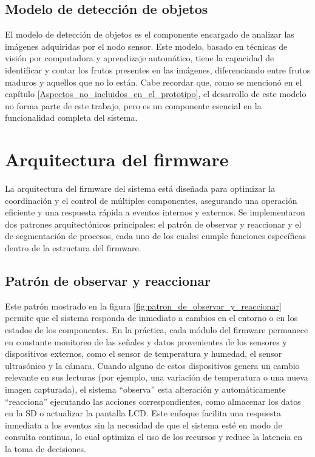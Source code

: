 \subsection{Modelo de detección de objetos}

El modelo de detección de objetos es el componente encargado de analizar las imágenes adquiridas por el nodo sensor. Este modelo, basado en técnicas de visión por computadora y aprendizaje automático, tiene la capacidad de identificar y contar los frutos presentes en las imágenes, diferenciando entre frutos maduros y aquellos que no lo están. Cabe recordar que, como se mencionó en el capítulo \ref{Aspectos_no_incluidos_en_el_prototipo}, el desarrollo de este modelo no forma parte de este trabajo, pero es un componente esencial en la funcionalidad completa del sistema. 

\newpage

\section{Arquitectura del firmware}

La arquitectura del firmware del sistema está diseñada para optimizar la coordinación y el control de múltiples componentes, asegurando una operación eficiente y una respuesta rápida a eventos internos y externos. Se implementaron dos patrones arquitectónicos principales: el patrón de observar y reaccionar y el de segmentación de procesos, cada uno de los cuales cumple funciones específicas dentro de la estructura del firmware.

\subsection{Patrón de observar y reaccionar}

Este patrón mostrado en la figura \ref{fig:patron_de_observar_y_reaccionar} permite que el sistema responda de inmediato a cambios en el entorno o en los estados de los componentes. En la práctica, cada módulo del firmware permanece en constante monitoreo de las señales y datos provenientes de los sensores y dispositivos externos, como el sensor de temperatura y humedad, el sensor ultrasónico y la cámara. Cuando alguno de estos dispositivos genera un cambio relevante en sus lecturas (por ejemplo, una variación de temperatura o una nueva imagen capturada), el sistema ``observa'' esta alteración y automáticamente ``reacciona'' ejecutando las acciones correspondientes, como almacenar los datos en la SD o actualizar la pantalla LCD. Este enfoque facilita una respuesta inmediata a los eventos sin la necesidad de que el sistema esté en modo de consulta continua, lo cual optimiza el uso de los recursos y reduce la latencia en la toma de decisiones.

